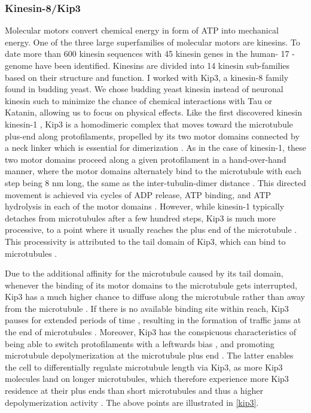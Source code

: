 \subsubsection{Kinesin-8/Kip3}
\label{sec:kip3_intro}
Molecular motors convert chemical energy in form of ATP into mechanical energy. One of the three large superfamilies of molecular motors are kinesins. To date more than 600 kinesin sequences with 45 kinesin genes in the human- 17 -genome \parencite{Endow3420} have been identified. Kinesins are divided into 14 kinesin sub-families based on their structure and function. I worked with Kip3, a kinesin-8 family found in budding yeast. We chose budding yeast kinesin instead of neuronal kinesin such to minimize the chance of chemical interactions with Tau or Katanin, allowing us to focus on physical effects. Like the first discovered kinesin kinesin-1 \parencite{Endow3420}, Kip3 is a homodimeric complex that moves toward the microtubule plus-end along protofilaments, propelled by its two motor domains connected by a neck linker which is essential for dimerization \parencite{Lin2020}. As in the case of kinesin-1, these two motor domains proceed along a given protofilament in a hand-over-hand manner, where the motor domains alternately bind to the microtubule with each step being 8 nm long, the same as the inter-tubulin-dimer distance \parencite{Xie2021}. This directed movement is achieved via cycles of ADP release, ATP binding, and ATP hydrolysis in each of the motor domains \parencite{Xie2021}. However, while kinesin-1 typically detaches from microtubules after a few hundred steps, Kip3 is much more processive, to a point where it usually reaches the plus end of the microtubule \parencite{Varga2009}. This processivity is attributed to the tail domain of Kip3, which can bind to microtubules \parencite{SU2011751}.\par

Due to the additional affinity for the microtubule caused by its tail domain, whenever the binding of its motor domains to the microtubule gets interrupted, Kip3 has a much higher chance to diffuse along the microtubule rather than away from the microtubule \parencite{Xie2021}. If there is no available binding site within reach, Kip3 pauses for extended periods of time \parencite{Varga2009}, resulting in the formation of traffic jams at the end of microtubules \parencite{Leduc2012}. Moreover, Kip3 has the conspicuous characteristics of being able to switch protofilaments with a leftwards bias \parencite{Bormuth2012}, and promoting microtubule depolymerization at the microtubule plus end \parencite{Lin2020}. The latter enables the cell to differentially regulate microtubule length via Kip3, as more Kip3 molecules land on longer microtubules, which therefore experience more Kip3 residence at their plus ends than short microtubules and thus a higher depolymerization activity \parencite{Varga2009}. The above points are illustrated in \autoref{kip3}.\par


